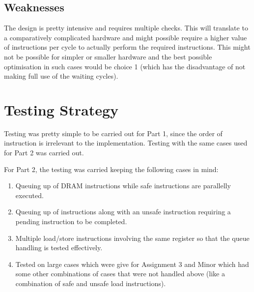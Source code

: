 \documentclass{article}
\begin{document}
\subsection{Weaknesses}
The design is pretty intensive and requires multiple checks. This will translate to a comparatively complicated hardware and might possible require a higher value of instructions per cycle to actually perform the required instructions. This might not be possible for simpler or smaller hardware and the best possible optimisation in such cases would be choice 1 (which has the disadvantage of not making full use of the waiting cycles).


\section{Testing Strategy}
Testing was pretty simple to be carried out for Part 1, since the order of instruction is irrelevant to the implementation. Testing with the same cases used for Part 2 was carried out.\par
For Part 2, the testing was carried keeping the following cases in mind:
\begin{enumerate}
    \item Queuing up of DRAM instructions while safe instructions are parallelly executed.
    \item Queuing up of instructions along with an unsafe instruction requiring a pending instruction to be completed.
    \item Multiple load/store instructions involving the same register so that the queue handling is tested effectively.
    \item Tested on large cases which were give for Assignment 3 and Minor which had some other combinations of cases that were not handled above (like a combination of safe and unsafe load instructions).
\end{enumerate}
\end{document}
